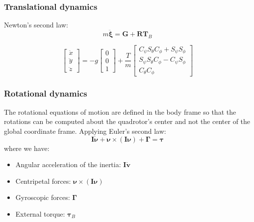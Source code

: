 \subsubsection{Translational dynamics}

Newton's second law: 
$$m \ddot{\boldsymbol{\xi}}=\boldsymbol{G}+\boldsymbol{R} \boldsymbol{T}_{B}$$

$$\left[ \begin{array}{c}{\ddot{x}} \\ {\ddot{y}} \\ {\ddot{z}}\end{array}\right]=-g \left[ \begin{array}{l}{0} \\ {0} \\ {1}\end{array}\right]+\frac{T}{m} \left[ \begin{array}{c}{C_{\psi} S_{\theta} C_{\phi}+S_{\psi} S_{\phi}} \\ {S_{\psi} S_{\theta} C_{\phi}-C_{\psi} S_{\phi}} \\ {C_{\theta} C_{\phi}}\end{array}\right]$$

\subsubsection{Rotational dynamics}
The rotational equations of motion are defined in the body frame so that the rotations can be computed about the quadrotor’s center and not the center of the global coordinate frame.
Applying Euler's second law:
$$\boldsymbol{I} \dot{\boldsymbol{\nu}}+\boldsymbol{\nu} \times(\boldsymbol{I} \boldsymbol{\nu})+\mathbf{\Gamma}=\boldsymbol{\tau}$$
where we have:
\begin{itemize}
  \item Angular acceleration of the inertia: $\boldsymbol{I\dot{v}}$
  \item Centripetal forces: $\boldsymbol{\nu}\times(\boldsymbol{I \nu})$
  \item Gyroscopic forces: $\boldsymbol{\Gamma}$
  \item External torque: $\boldsymbol{\tau}_B$
\end{itemize}

